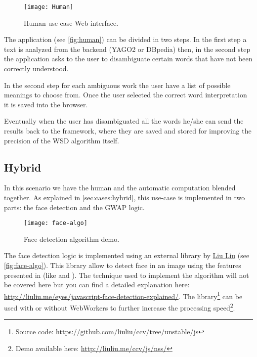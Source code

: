 \begin{figure}[htb]
    \centering
    \texttt{[image: Human]}
    \caption{Human use case Web interface.}
    \label{fig:human}
\end{figure}
The application (see \autoref{fig:human}) can be divided in two steps.
In the first step a text is
analyzed from the backend (YAGO2 or DBpedia) then, in the second step the
application asks to the user to disambiguate certain words that have not been
correctly understood.

In the second step for each ambiguous work the user have a list of possible
meanings to choose from. Once the user selected the correct word interpretation
it is saved into the browser.

Eventually when the user has disambiguated all the words he/she can send the
results back to the framework, where they are saved and stored for improving the
precision of the \ac{WSD} algorithm itself.





















\subsection{Hybrid}
In this scenario we have the human and the automatic computation blended together.
As explained in \ref{sec:cases:hybrid}, this use-case is implemented in two
parts: the face detection and the \ac{GWAP} logic.\\

\begin{figure}[htb]
    \centering
    \texttt{[image: face-algo]}
    \caption{Face detection algorithm demo.}
    \label{fig:face-algo}
\end{figure}

The face detection logic is implemented using an external library  by
\href{http://liuliu.me/}{Liu Liu} (see \autoref{fig:face-algo}). This library allow to detect face in an image
using the \js{} features presented in (like  and ).
The technique used to implement the algorithm will not be covered here but you
can find a detailed explanation here:
\url{http://liuliu.me/eyes/javascript-face-detection-explained/}.
The library\footnote{Source code: \url{https://github.com/liuliu/ccv/tree/unstable/js}}
can be used with or without WebWorkers to further increase the processing
speed\footnote{Demo available here: \url{http://liuliu.me/ccv/js/nss/}}.\\


